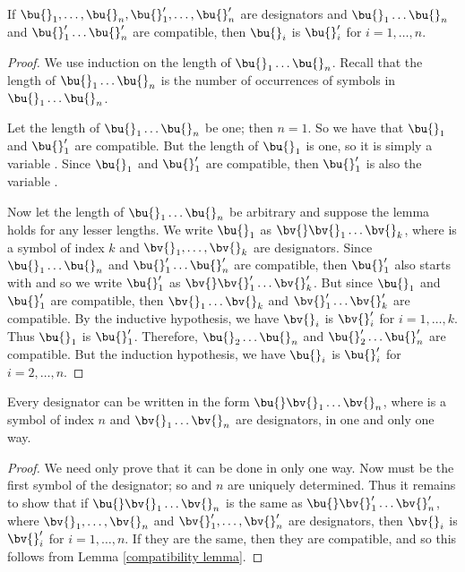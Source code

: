 \begin{lemma}\label{compatibility lemma}
    If $\bu{}_1, \dots, \bu{}_n, \bu{}_1', \dots, \bu{}_n'$ are designators and $\bu{}_1 \dots \bu{}_n$ and $\bu{}_1' \dots \bu{}_n'$ are compatible, then $\bu{}_i$ is $\bu{}_i'$ for $i = 1,\dots,n$.
\end{lemma}

\begin{proof}
    We use induction on the length of $\bu{}_1 \dots \bu{}_n$.
    Recall that the length of $\bu{}_1 \dots \bu{}_n$ is the number of occurrences of symbols in $\bu{}_1 \dots \bu{}_n$.
    
    Let the length of $\bu{}_1 \dots \bu{}_n$ be one;
    then $n = 1$.
    So we have that $\bu{}_1$ and $\bu{}_1'$ are compatible.
    But the length of $\bu{}_1$ is one, so it is simply a variable \x{}.
    Since $\bu{}_1$ and $\bu{}_1'$ are compatible, then $\bu{}_1'$ is also the variable \x{}.
    
    Now let the length of $\bu{}_1 \dots \bu{}_n$ be arbitrary and suppose the lemma holds for any lesser lengths.
    We write $\bu{}_1$ as $\bv{} \bv{}_1 \dots \bv{}_k$, where \bv{} is a symbol of index $k$ and $\bv{}_1, \dots, \bv{}_k$ are designators.
    Since $\bu{}_1 \dots \bu{}_n$ and $\bu{}_1' \dots \bu{}_n'$ are compatible, then $\bu{}_1'$ also starts with \bv{} and so we write $\bu{}_1'$ as $\bv{} \bv{}_1' \dots \bv{}_k'$.
    But since $\bu{}_1$ and $\bu{}_1'$ are compatible, then $\bv{}_1 \dots \bv{}_k$ and $\bv{}_1' \dots \bv{}_k'$ are compatible.
    By the inductive hypothesis, we have $\bv{}_i$ is $\bv{}_i'$ for $i = 1, \dots, k$.
    Thus $\bu{}_1$ is $\bu{}_1'$.
    Therefore, $\bu{}_2 \dots \bu{}_n$ and $\bu{}_2' \dots \bu{}_n'$ are compatible.
    But the induction hypothesis, we have $\bu{}_i$ is $\bu{}_i'$ for $i = 2, \dots, n$.
\end{proof}

\begin{theorem}
    Every designator can be written in the form $\bu{} \bv{}_1 \dots \bv{}_n$, where \bu{} is a symbol of index $n$ and $\bv{}_1 \dots \bv{}_n$ are designators, in one and only one way.
\end{theorem}

\begin{proof}
    We need only prove that it can be done in only one way.
    Now \bu{} must be the first symbol of the designator;
    so \bu{} and $n$ are uniquely determined.
    Thus it remains to show that if $\bu{} \bv{}_1 \dots \bv{}_n$ is the same as $\bu{} \bv{}_1' \dots \bv{}_n'$, where $\bv{}_1, \dots, \bv{}_n$ and $\bv{}_1', \dots, \bv{}_n'$ are designators, then $\bv{}_i$ is $\bv{}_i'$ for $i = 1, \dots, n$.
    If they are the same, then they are compatible, and so this follows from Lemma \ref{compatibility lemma}.
\end{proof}

